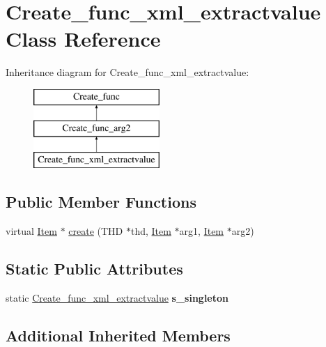 \hypertarget{classCreate__func__xml__extractvalue}{}\section{Create\+\_\+func\+\_\+xml\+\_\+extractvalue Class Reference}
\label{classCreate__func__xml__extractvalue}
Inheritance diagram for Create\+\_\+func\+\_\+xml\+\_\+extractvalue\+:\begin{figure}[H]
\begin{center}
\leavevmode
\includegraphics[height=3.000000cm]{classCreate__func__xml__extractvalue}
\end{center}
\end{figure}
\subsection*{Public Member Functions}
\begin{DoxyCompactItemize}
\item 
virtual \mbox{\hyperlink{classItem}{Item}} $\ast$ \mbox{\hyperlink{classCreate__func__xml__extractvalue_aaa8d2e4dd4e4f6cd707b4a5f6fb6a128}{create}} (T\+HD $\ast$thd, \mbox{\hyperlink{classItem}{Item}} $\ast$arg1, \mbox{\hyperlink{classItem}{Item}} $\ast$arg2)
\end{DoxyCompactItemize}
\subsection*{Static Public Attributes}
\begin{DoxyCompactItemize}
\item 
\mbox{\label{classCreate__func__xml__extractvalue_aafb75d565c8e0c9360c6577ae360ebb3}} 
static \mbox{\hyperlink{classCreate__func__xml__extractvalue}{Create\+\_\+func\+\_\+xml\+\_\+extractvalue}} {\bfseries s\+\_\+singleton}
\end{DoxyCompactItemize}
\subsection*{Additional Inherited Members}


